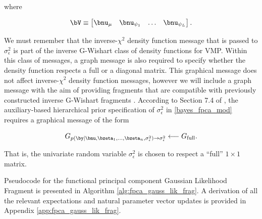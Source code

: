 \documentclass[12pt]{article}
\def\sigsqeps{\sigma^2_{\epsilon}}
\def\numu{\bnu_\mu}
\newcommand\nupsi[1]{\bnu_{\psi_{#1}}}
\theoremstyle{plain}
\theoremstyle{definition}
\theoremstyle{remark}
\begin{document}
\noindent where

\begin{equation}
	\bV \equiv \begin{bmatrix}
		\numu & \nupsi{1} & \dots & \nupsi{L}
	\end{bmatrix}.
\label{V_mat}
\end{equation}

\noindent We must remember that the inverse-$\chi^2$ density function message that is passed
to $\sigsqeps$ is part of the inverse G-Wishart class of density functions for VMP. Within this class of messages,
a graph message is also required to specify whether the density function respects a full or a diagonal matrix. This
graphical message does not affect inverse-$\chi^2$ density function messages, however we will include
a graph message with the aim of providing fragments that are compatible with previously constructed inverse
G-Wishart fragments \cite[Algorithms 1 \& 2]{maestrini20}. According to Section 7.4 of ,
the auxiliary-based hierarchical prior specification of $\sigsqeps$ in \eqref{bayes_fpca_mod} requires a
graphical message of the form

\begin{equation}
	G_{p (\by | \bnu, \bzeta_1, \dots, \bzeta_n, \sigsqeps) \rightarrow \sigsqeps}
		\longleftarrow
			G_{\text{full}}.
\label{G_lik_sigsqeps}
\end{equation}

\noindent That is, the univariate random variable $\sigsqeps$ is chosen to respect a ``full'' $1 \times 1$ matrix.

Pseudocode for the functional principal component
Gaussian Likelihood Fragment is presented in Algorithm \ref{alg:fpca_gauss_lik_frag}.
A derivation of all the relevant expectations and natural parameter vector updates is provided in Appendix
\ref{app:fpca_gauss_lik_frag}.
\end{document}
